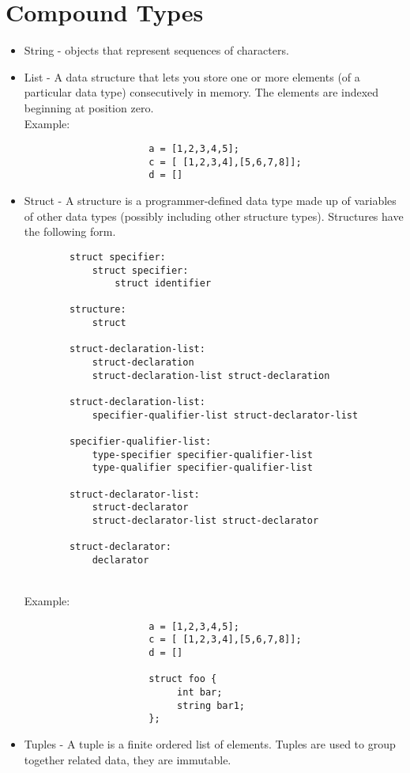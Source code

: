 \documentclass[./LRM_main.tex]{subfiles}
\begin{document}
\section{Compound Types}
\begin{itemize}
    \item String - objects that represent sequences of characters. 
    \item List - A data structure that lets you store one or more elements (of a particular data type) consecutively in memory. The elements are indexed beginning at position zero. 
    \\Example:

\begin{lstlisting}
                      a = [1,2,3,4,5];
		              c = [ [1,2,3,4],[5,6,7,8]];
		              d = []
\end{lstlisting}
    \item Struct - A structure is a programmer-defined data type made up of variables of other data types (possibly including other structure types). Structures have the following form.
    \begin{lstlisting}
        struct specifier:
            struct specifier:
                struct identifier
                
        structure:
            struct
            
        struct-declaration-list:
            struct-declaration
            struct-declaration-list struct-declaration
        
        struct-declaration-list:
            specifier-qualifier-list struct-declarator-list
        
        specifier-qualifier-list:
            type-specifier specifier-qualifier-list
            type-qualifier specifier-qualifier-list
        
        struct-declarator-list:
            struct-declarator
            struct-declarator-list struct-declarator
        
        struct-declarator:
            declarator
  \end{lstlisting}
 \\ Example:
        \begin{lstlisting}
                      a = [1,2,3,4,5];
		              c = [ [1,2,3,4],[5,6,7,8]];
		              d = []
		              
		              struct foo {
			               int bar;
			               string bar1;
                      };

\end{lstlisting}
        

    \item Tuples - A tuple is a finite ordered list of elements. Tuples are used to group together related data, they are immutable.
    
    
\end{itemize}
\end{document}

